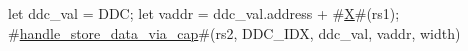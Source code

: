 let ddc_val = DDC;
let vaddr = ddc_val.address + #\hyperref[sailRISCVzX]{X}#(rs1);
#\hyperref[sailRISCVzhandlezystorezydatazyviazycap]{handle\_store\_data\_via\_cap}#(rs2, DDC_IDX, ddc_val, vaddr, width)
